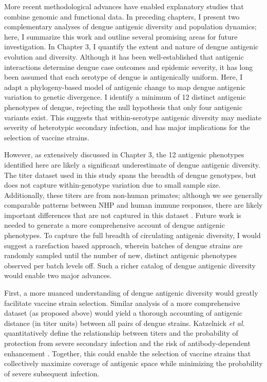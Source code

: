 More recent methodological advances have enabled explanatory studies that combine genomic and functional data.
In preceding chapters, I present two complementary analyses of dengue antigenic diversity and population dynamics; here, I summarize this work and outline several promising areas for future investigation.
In Chapter 3, I quantify the extent and nature of dengue antigenic evolution and diversity.
Although it has been well-established that antigenic interactions determine dengue case outcomes and epidemic severity, it has long been assumed that each serotype of dengue is antigenically uniform.
Here, I adapt a phylogeny-based model of antigenic change to map dengue antigenic variation to genetic divergence.
I identify a minimum of 12 distinct antigenic phenotypes of dengue, rejecting the null hypothesis that only four antigenic variants exist.
This suggests that within-serotype antigenic diversity may mediate severity of heterotypic secondary infection, and has major implications for the selection of vaccine strains.

However, as extensively discussed in Chapter 3, the 12 antigenic phenotypes identified here are likely a significant underestimate of dengue antigenic diversity.
The titer dataset used in this study spans the breadth of dengue genotypes, but does not capture within-genotype variation due to small sample size.
Additionally, these titers are from non-human primates; although we see generally comparable patterns between NHP and human immune responses, there are likely important differences that are not captured in this dataset \citep{katzelnick2015dengue}.
Future work is needed to generate a more comprehensive account of dengue antigenic phenotypes.
To capture the full breadth of circulating antigenic diversity, I would suggest a rarefaction based approach, wherein batches of dengue strains are randomly sampled until the number of new, distinct antigenic phenotypes observed per batch levels off.
Such a richer catalog of dengue antigenic diversity would enable two major advances.

First, a more nuanced understanding of dengue antigenic diversity would greatly facilitate vaccine strain selection.
Similar analysis of a more comprehensive dataset (as proposed above) would yield a thorough accounting of antigenic distance (in titer units) between all pairs of dengue strains.
Katzelnick \textit{et al.} quantitatively define the relationship between titers and the probability of protection from severe secondary infection \citep{katzelnick2016neutralizing} and the risk of antibody-dependent enhancement \citep{katzelnick2017antibody}.
Together, this could enable the selection of vaccine strains that collectively maximize coverage of antigenic space while minimizing the probability of severe subsequent infection.

